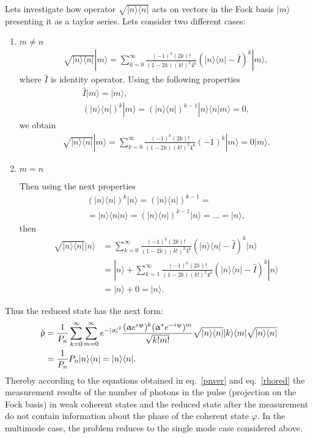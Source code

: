 %
Lets investigate how operator $\sqrt{|n\rangle\langle n|}$ acts on vectors in the Fock basis $|m\rangle$ presenting it as a taylor series. Lets consider two different cases:
%
\begin{enumerate}
    \item $m \neq n$
    \begin{align}
        \sqrt{|n\rangle\langle n|}|m\rangle = \sum_{k=0}^{\infty} \frac{(-1)^k(2k)!}{(1-2k)(k!)^2 4^k}(|n\rangle\langle n|-\hat{I})^k|m\rangle ,
    \end{align}
    where $\hat{I}$ is identity operator. Using the following properties
    \begin{gather}
        \hat{I}|m\rangle=|m\rangle, \\
        (|n\rangle\langle n|)^k |m\rangle = (|n\rangle\langle n|)^{k-1} |n\rangle\langle n|m\rangle = 0,
    \end{gather}
    we obtain
    \begin{align}
       \sqrt{|n\rangle\langle n|}|m\rangle = \sum_{k=0}^{\infty} \frac{(-1)^k(2k)!}{(1-2k)(k!)^2 4^k}(-1)^k|m\rangle = 0 |m\rangle.
    \end{align}
    \item $m=n$
    
    Then using the next properties
    \begin{align}
        (|n\rangle\langle n|)^k |n\rangle = (|n\rangle\langle n|)^{k-1}=\nonumber\\ =|n\rangle\langle n|n\rangle = (|n\rangle\langle n|)^{k-1} |n\rangle = ... = |n\rangle,
    \end{align}
    then
    \begin{align}
        \sqrt{|n\rangle\langle n|}|n\rangle &= \sum_{k=0}^{\infty} \frac{(-1)^k(2k)!}{(1-2k)(k!)^2 4^k}(|n\rangle\langle n|-\hat{I})^k|n\rangle \nonumber\\
        &=|n\rangle + \sum_{k=1}^{\infty} \frac{(-1)^k(2k)!}{(1-2k)(k!)^2 4^k}(|n\rangle\langle n|-\hat{I})^k|n\rangle \nonumber\\
        &=|n\rangle + 0 = |n\rangle.
    \end{align}
\end{enumerate}
%
Thus the reduced state has the next form:
%
\begin{align}
   \Tilde{\rho}&=\frac{1}{P_n}\sum_{k=0}^{\infty}\sum_{m=0}^{\infty} e^{-|\alpha|^2} \frac{(\alpha e^{i \varphi})^k(\alpha^{*} e^{-i \varphi})^m}{\sqrt{k!m!}} \sqrt{|n\rangle\langle n|}|k\rangle\langle m |\sqrt{|n\rangle\langle n|} \nonumber \\
   &= \frac{1}{P_n} P_n |n\rangle\langle n| = |n\rangle\langle n|. \label{rhored}
\end{align}
%
Thereby according to the equations obtained in eq.~\ref{pnver} and eq.~\ref{rhored} the measurement results  of the number of photons in the pulse (projection on the Fock basis) in weak coherent states and the reduced state after the measurement do not contain information about the phase of the coherent state $\varphi$. In the multimode case, the problem reduces to the single mode case considered above.

